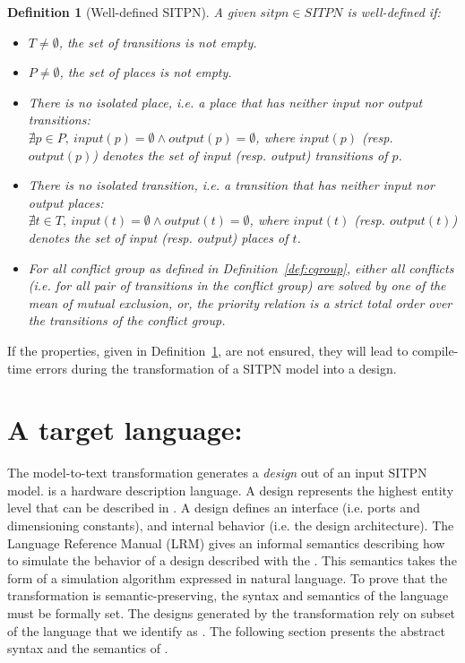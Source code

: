 \documentclass[pdflatex,sn-mathphys]{sn-jnl}%
\theoremstyle{thmstyleone}%
\theoremstyle{thmstyletwo}%
\theoremstyle{thmstylethree}%
\newtheorem{definition}{Definition}%
\begin{document}
\begin{definition}[Well-defined SITPN]\label{def:wd-sitpn}
  A given $sitpn\in{}SITPN$ is well-defined if:
  \begin{itemize}
  \item $T\neq\emptyset$, the set of transitions is not empty.
  \item $P\neq\emptyset$, the set of places is not empty.
  \item There is no isolated place, i.e. a place that has neither
    input nor output transitions:\\
    $\nexists{}p\in{}P,~input(p)=\emptyset\wedge{}output(p)=\emptyset$,
    where $input(p)$ (resp. $output(p)$) denotes the set of input
    (resp. output) transitions of $p$.
  \item There is no isolated transition, i.e. a transition that has
    neither
    input nor output places:\\
    $\nexists{}t\in{}T,~input(t)=\emptyset\wedge{}output(t)=\emptyset$,
    where $input(t)$ (resp. $output(t)$) denotes the set of input
    (resp. output) places of $t$.
  \item For all conflict group as defined in
    Definition~\ref{def:cgroup}, either all conflicts (i.e. for all
    pair of transitions in the conflict group) are solved by one of
    the mean of mutual exclusion, or, the priority relation is a
    \emph{strict total} order over the transitions of the conflict group.
  \end{itemize}
\end{definition}

If the properties, given in Definition~\ref{def:wd-sitpn}, are not
ensured, they will lead to compile-time errors during the
transformation of a SITPN model into a \vhdl{} design.

\section{A target language: \hvhdl{}}
\label{sec:hvhdl}

The \hilecop{} model-to-text transformation generates a \vhdl{}
\emph{design} out of an input SITPN model.  \vhdl{} is a hardware
description language. A design represents the highest entity level
that can be described in \vhdl{}. A design defines an interface
(i.e. ports and dimensioning constants), and internal behavior
(i.e. the design architecture). The \vhdl{} Language Reference Manual
(LRM) \cite{VHDL2000} gives an informal semantics describing how to
simulate the behavior of a design described with the \vhdl{}. This
semantics takes the form of a simulation algorithm expressed in
natural language. To prove that the \hilecop{} transformation is
semantic-preserving, the syntax and semantics of the \vhdl{} language
must be formally set. The designs generated by the \hilecop{}
transformation rely on subset of the \vhdl{} language that we identify
as \hvhdl{}. The following section presents the abstract syntax and
the semantics of \hvhdl{}.
\end{document}
